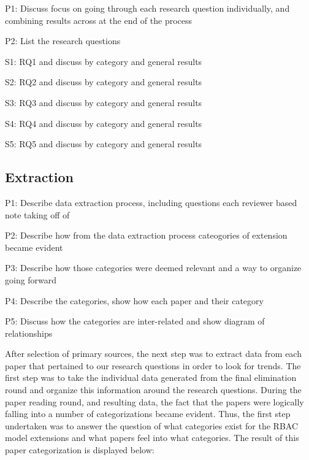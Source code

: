 P1: Discuss focus on going through each research question individually, and combining results across at the end of the process

P2: List the research questions

S1: RQ1 and discuss by category and general results

S2: RQ2 and discuss by category and general results

S3: RQ3 and discuss by category and general results

S4: RQ4 and discuss by category and general results

S5: RQ5 and discuss by category and general results


\subsection{Extraction}

P1: Describe data extraction process, including questions each reviewer based note taking off of

P2: Describe how from the data extraction process cateogories of extension became evident

P3: Describe how those categories were deemed relevant and a way to organize going forward

P4: Describe the categories, show how each paper and their category

P5: Discuss how the categories are inter-related and show diagram of relationships

After selection of primary sources, the next step was to extract data from each paper that pertained to our research questions in order to look for trends.  The first step was to take the individual data generated from the final elimination round and organize this information around the research questions.  During the paper reading round, and resulting data, the fact that the papers were logically falling into a number of categorizations became evident.  Thus, the first step undertaken was to answer the question of what categories exist for the RBAC model extensions and what papers feel into what categories.  The result of this paper categorization is displayed below:

